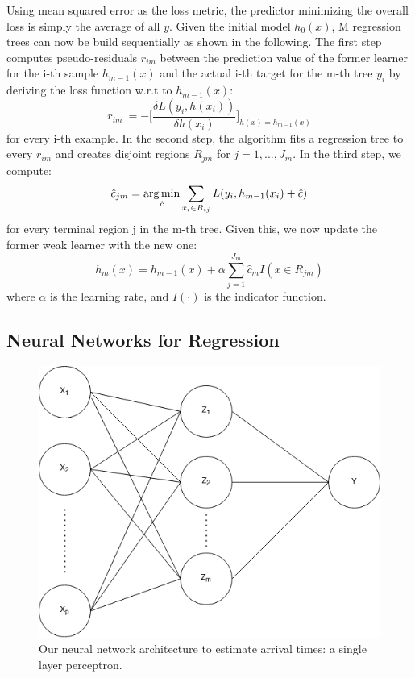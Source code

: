 Using mean squared error as the loss metric, the predictor minimizing the overall loss is simply the average of all $ y $.
Given the initial model $ h_0(x) $, M regression trees can now be build sequentially as shown in the following. 
The first step computes pseudo-residuals $ r_{im} $ between the prediction value of the former learner for the i-th sample $ h_{m-1}(x) $ and the actual i-th target for the m-th tree $ y_i $ by deriving the loss function w.r.t to $ h_{m-1}(x) $: 
\begin{equation}
	r_{im}\ = - \bigg[\dfrac{\delta L(y_i, h(x_i))}{\delta h(x_i)}\bigg]_{h(x) = h_{m-1}(x)}
\end{equation} 
for every i-th example.
In the second step, the algorithm fits a regression tree to every $ r_{im} $ and creates disjoint regions $ R_{jm} $ for $j = 1, ..., J_m$. 
In the third step, we compute: 
\begin{equation}
	\hat{c}_{jm} = \operatorname*{arg\,min}_{\hat{c}} \sum_{x_i \in R_{ij}} L(y_i, h_{m-1}(x_i) + \hat{c})
\end{equation}
for every terminal region j in the m-th tree. 
Given this, we now update the former weak learner with the new one:
\begin{equation}
	h_m(x) = h_{m-1}(x) + \alpha \sum_{j=1}^{J_m} \hat{c}_{m}I(x \in R_{jm})
\end{equation}
where $ \alpha $ is the learning rate, and $ I(\cdot) $ is the indicator function. 


\subsection{Neural Networks for Regression}


\begin{figure}[h]
	\centering
	\includegraphics[width=0.5\linewidth]{../simplenn.png}
	\caption{Our neural network architecture to estimate arrival times: a single layer perceptron.}
	\label{fig:nnarchitecture}
\end{figure}


